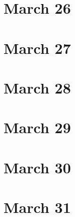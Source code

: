 \section{March 26}

\section{March 27}

\section{March 28}

\section{March 29}

\section{March 30}

\section{March 31}


